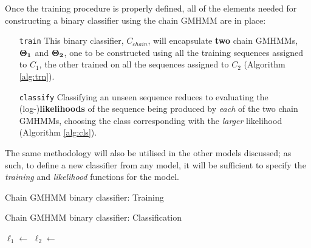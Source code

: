 \documentclass[12pt,a4paper,twoside,openright]{report}
\begin{document}
Once the training procedure is properly defined, all of the elements needed for constructing a binary classifier using the chain GMHMM are in place:
\begin{itemize}
	\item[\tt train] This binary classifier, $C_{chain}$, will encapsulate {\bf two} chain GMHMMs, ${\bf \Theta_1}$ and ${\bf \Theta_2}$, one to be constructed using all the training sequences assigned to $C_1$, the other trained on all the sequences assigned to $C_2$ (Algorithm \ref{alg:trn}). 
	\item[\tt classify] Classifying an unseen sequence reduces to evaluating the (log-){\bf likelihoods} of the sequence being produced by \emph{each} of the two chain GMHMMs, choosing the class corresponding with the \emph{larger} likelihood (Algorithm \ref{alg:cls}). 
\end{itemize}
The same methodology will also be utilised in the other models discussed; as such, to define a new classifier from any model, it will be sufficient to specify the \emph{training} and \emph{likelihood} functions for the model.
\begin{algorithm}[H]
\caption{Chain GMHMM binary classifier: Training}\label{alg:trn}
\begin{algorithmic}[1]
 
	\State {} 
	\State {} 
\EndProcedure
\end{algorithmic}
\end{algorithm}
\begin{algorithm}[H]
\caption{Chain GMHMM binary classifier: Classification}\label{alg:cls}
\begin{algorithmic}[1]
 
	\State $\ell_1\gets$  
	\State $\ell_2\gets$  
	\Else{} 
	\EndIf
\EndFunction
{}
\end{algorithmic}
\end{algorithm}
\end{document}
